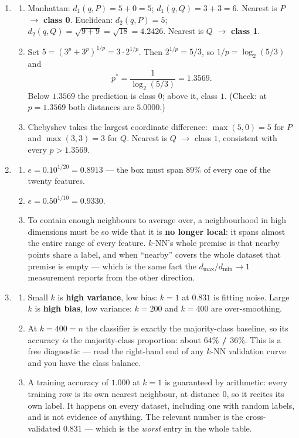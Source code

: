 \documentclass[11pt]{article}
\begin{document}
\begin{enumerate}[leftmargin=*, itemsep=0.7em]
\item
  \begin{enumerate}[label=(\alph*)]
    \item Manhattan: $d_1(q,P) = 5 + 0 = 5$; $d_1(q,Q) = 3 + 3 = 6$. Nearest
      is $P$ $\to$ \textbf{class 0}. Euclidean: $d_2(q,P) = 5$;
      $d_2(q,Q) = \sqrt{9+9} = \sqrt{18} = 4.2426$. Nearest is $Q$ $\to$
      \textbf{class 1}.
    \item Set $5 = (3^p + 3^p)^{1/p} = 3 \cdot 2^{1/p}$. Then
      $2^{1/p} = 5/3$, so $1/p = \log_2(5/3)$ and
      \[
        p^\ast = \frac{1}{\log_2(5/3)} = \mathbf{1.3569}.
      \]
      Below $1.3569$ the prediction is class $0$; above it, class $1$.
      (Check: at $p = 1.3569$ both distances are $5.0000$.)
    \item Chebyshev takes the largest coordinate difference: $\max(5,0) = 5$
      for $P$ and $\max(3,3) = 3$ for $Q$. Nearest is $Q$ $\to$ class $1$,
      consistent with every $p > 1.3569$.
  \end{enumerate}

\item
  \begin{enumerate}[label=(\alph*)]
    \item $e = 0.10^{1/20} = \mathbf{0.8913}$ --- the box must span $89\%$ of
      every one of the twenty features.
    \item $e = 0.50^{1/10} = \mathbf{0.9330}$.
    \item To contain enough neighbours to average over, a neighbourhood in high
      dimensions must be so wide that it is \textbf{no longer local}: it spans
      almost the entire range of every feature. $k$-NN's whole premise is that
      nearby points share a label, and when ``nearby'' covers the whole dataset
      that premise is empty --- which is the same fact the $d_{\max}/d_{\min}
      \to 1$ measurement reports from the other direction.
  \end{enumerate}

\item
  \begin{enumerate}[label=(\alph*)]
    \item Small $k$ is \textbf{high variance}, low bias: $k=1$ at $0.831$ is
      fitting noise. Large $k$ is \textbf{high bias}, low variance: $k=200$ and
      $k=400$ are over-smoothing.
    \item At $k = 400 = n$ the classifier is exactly the majority-class
      baseline, so its accuracy \emph{is} the majority-class proportion:
      about \textbf{$64\%$ / $36\%$}. This is a free diagnostic --- read the
      right-hand end of any $k$-NN validation curve and you have the class
      balance.
    \item A training accuracy of $1.000$ at $k=1$ is guaranteed by arithmetic:
      every training row is its own nearest neighbour, at distance $0$, so it
      recites its own label. It happens on every dataset, including one with
      random labels, and is not evidence of anything. The relevant number is
      the cross-validated $0.831$ --- which is the \emph{worst} entry in the
      whole table.
  \end{enumerate}


\end{enumerate}
\end{document}
